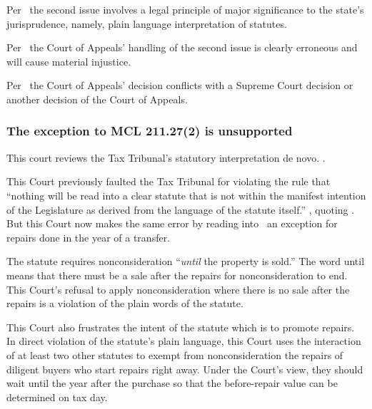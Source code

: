 \documentclass[12pt,\documentclassflag]{michiganCourtOfAppealsBrief}
\begin{document}
Per \cite{MCR 7.305(B)(3)}\ the second issue involves a legal principle of major significance to the state's jurisprudence, namely, plain language interpretation of statutes. 

Per \cite{MCR 7.305(B)(5a)}\ the Court of Appeals' handling of the second issue is clearly erroneous and will cause material injustice.

Per \cite{MCR 7.305(B)(5b)}\ the Court of Appeals' decision conflicts with a Supreme Court decision or another decision of the Court of Appeals. 

\subsubsection{The exception to MCL 211.27(2) is unsupported}

This court reviews the Tax Tribunal's statutory interpretation de novo. .

This Court previously faulted the Tax Tribunal for violating the rule that ``nothing will be read into a clear statute that is not within the manifest intention of the Legislature as derived from the language of the statute itself.'' , quoting . But this Court now makes the same error by reading into \mathieuGast\ an exception for repairs done in the year of a transfer. 


The statute requires nonconsideration ``\emph{until} the property is sold.'' The word until means that there must be a sale after the repairs for nonconsideration to end. This Court's refusal to apply nonconsideration where there is no sale after the repairs is a violation of the plain words of the statute.

This Court also frustrates the intent of the statute which is to promote repairs.
In direct violation of the statute's plain language, this Court uses the interaction of at least two other statutes to exempt from nonconsideration the repairs of diligent buyers who start repairs right away.
Under the Court's view, they should wait until the year after the purchase so that the before-repair value can be determined on tax day.
\end{document}
